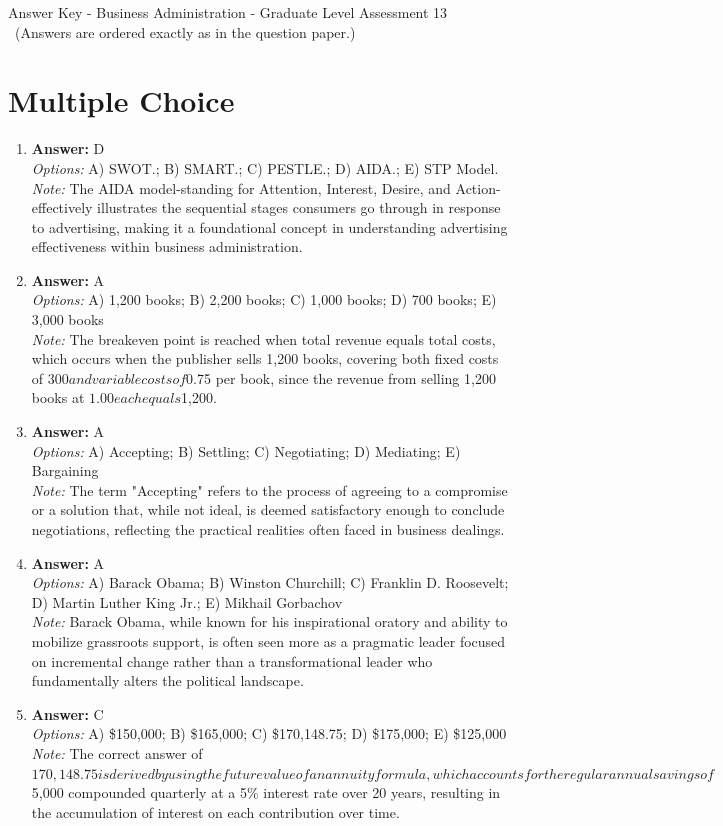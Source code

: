 \documentclass[12pt]{article}
\begin{document}
\begin{center}
Answer Key - Business Administration - Graduate Level Assessment 13 \
\small (Answers are ordered exactly as in the question paper.)
\end{center}

\section*{Multiple Choice}
\begin{enumerate}[label=\arabic*.]
\item \textbf{Answer:} D
\\ \textit{Options:} A) SWOT.; B) SMART.; C) PESTLE.; D) AIDA.; E) STP Model.
\\ \textit{Note:} The AIDA model-standing for Attention, Interest, Desire, and Action-effectively illustrates the sequential stages consumers go through in response to advertising, making it a foundational concept in understanding advertising effectiveness within business administration.
\item \textbf{Answer:} A
\\ \textit{Options:} A) 1,200 books; B) 2,200 books; C) 1,000 books; D) 700 books; E) 3,000 books
\\ \textit{Note:} The breakeven point is reached when total revenue equals total costs, which occurs when the publisher sells 1,200 books, covering both fixed costs of $300 and variable costs of $0.75 per book, since the revenue from selling 1,200 books at $1.00 each equals $1,200.
\item \textbf{Answer:} A
\\ \textit{Options:} A) Accepting; B) Settling; C) Negotiating; D) Mediating; E) Bargaining
\\ \textit{Note:} The term "Accepting" refers to the process of agreeing to a compromise or a solution that, while not ideal, is deemed satisfactory enough to conclude negotiations, reflecting the practical realities often faced in business dealings.
\item \textbf{Answer:} A
\\ \textit{Options:} A) Barack Obama; B) Winston Churchill; C) Franklin D. Roosevelt; D) Martin Luther King Jr.; E) Mikhail Gorbachov
\\ \textit{Note:} Barack Obama, while known for his inspirational oratory and ability to mobilize grassroots support, is often seen more as a pragmatic leader focused on incremental change rather than a transformational leader who fundamentally alters the political landscape.
\item \textbf{Answer:} C
\\ \textit{Options:} A) \$150,000; B) \$165,000; C) \$170,148.75; D) \$175,000; E) \$125,000
\\ \textit{Note:} The correct answer of $170,148.75 is derived by using the future value of an annuity formula, which accounts for the regular annual savings of $5,000 compounded quarterly at a 5\% interest rate over 20 years, resulting in the accumulation of interest on each contribution over time.
\end{enumerate}
\end{document}
